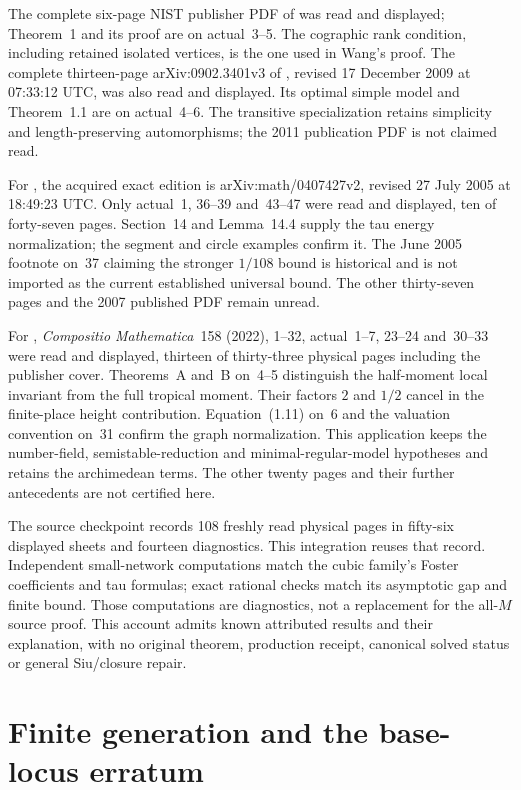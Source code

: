 The complete six-page NIST publisher PDF of
\cite{Edmonds65MatroidPartitionPublished} was read and displayed;
Theorem~1 and its proof are on actual~3--5. The cographic rank
condition, including retained isolated vertices, is the one used
in Wang's proof. The complete thirteen-page
arXiv:\allowbreak 0902.3401v3 of
\cite{Cinkir09DiscreteLaplacianV3}, revised 17 December 2009 at
07:33:12 UTC, was also read and displayed. Its optimal simple
model and Theorem~1.1 are on actual~4--6. The transitive
specialization retains simplicity and length-preserving
automorphisms; the 2011 publication PDF is not claimed read.

For \cite{BakerRumely05HarmonicV2}, the acquired exact edition is
arXiv:\allowbreak math/0407427v2, revised 27 July 2005 at
18:49:23 UTC. Only actual~1, 36--39 and~43--47 were read and
displayed, ten of forty-seven pages. Section~14 and Lemma~14.4
supply the tau energy normalization; the segment and circle
examples confirm it. The June 2005 footnote on~37 claiming the
stronger $1/108$ bound is historical and is not imported as the
current established universal bound. The other thirty-seven
pages and the 2007 published PDF remain unread.

For \cite{dJS22HeightPublished}, \emph{Compositio Mathematica}~158
(2022), 1--32, actual~1--7, 23--24 and~30--33 were read and
displayed, thirteen of thirty-three physical pages including
the publisher cover. Theorems~A and~B on~4--5 distinguish the
half-moment local invariant from the full tropical moment.
Their factors $2$ and $1/2$ cancel in the finite-place height
contribution. Equation~(1.11) on~6 and the valuation convention
on~31 confirm the graph normalization. This application keeps
the number-field, semistable-reduction and minimal-regular-model
hypotheses and retains the archimedean terms. The other twenty
pages and their further antecedents are not certified here.

The source checkpoint records 108 freshly read physical pages
in fifty-six displayed sheets and fourteen diagnostics. This
integration reuses that record. Independent small-network
computations match the cubic family's Foster coefficients and
tau formulas; exact rational checks match its asymptotic gap and
finite bound. Those computations are diagnostics, not a replacement
for the all-$M$ source proof. This account admits known attributed
results and their explanation, with no original theorem,
production receipt, canonical solved status or general Siu/closure
repair.

\section{Finite generation and the base-locus erratum}
\label{sec:provenance-ELMNP-fans}

